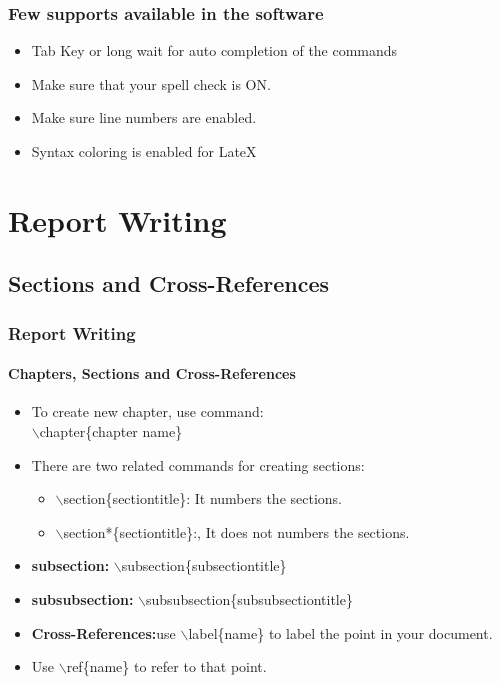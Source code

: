 \documentclass [9pt] {beamer}
\begin{document}
\begin{frame}\frametitle{Few supports available in the software}
\begin{itemize}
	\item Tab Key or long wait for auto completion of the commands
	\item Make sure that your spell check is ON.
	\item Make sure line numbers are enabled.
	\item Syntax coloring is enabled for LateX
\end{itemize}
\end{frame}


\section{Report Writing}\label{Report Writing}
\subsection{Sections and Cross-References}\label{Sections and Cross-References}

\begin{frame}\frametitle{Report Writing}
\framesubtitle{Chapters, Sections and Cross-References}
\rm
\fontsize{9pt}{11pt}\selectfont

\begin{itemize}
	\item To create new chapter, use command:\\
	\textcolor[rgb]{0.98,0.00,0.00}{$\backslash$chapter\{chapter name\}}
  \item There are two related commands for creating sections: \\[.20cm]
   \begin{itemize}
    \item \textcolor[rgb]{0.98,0.00,0.00}{$\backslash$section\{sectiontitle\}:} It numbers the sections.\\[.20cm]
    \item \textcolor[rgb]{0.98,0.00,0.00}{$\backslash$section*\{sectiontitle\}:}, It does not numbers the sections.\\[.20cm]
  \end{itemize}
  \item \textbf{subsection:} \textcolor[rgb]{0.98,0.00,0.00}{$\backslash$subsection\{subsectiontitle\}}\\[.20cm]
  \item \textbf{subsubsection:} \textcolor[rgb]{0.98,0.00,0.00}{$\backslash$subsubsection\{subsubsectiontitle\}}\\[.20cm]
  \item \textbf{Cross-References:}use \textcolor[rgb]{0.98,0.00,0.00}{$\backslash$label\{name\}} to label the point in your document.\\[.20cm]
  \item Use \textcolor[rgb]{0.98,0.00,0.00}{$\backslash$ref\{name\}} to refer to that point.\\[.20cm]
  \end{itemize}
\end{frame}
\end{document}

